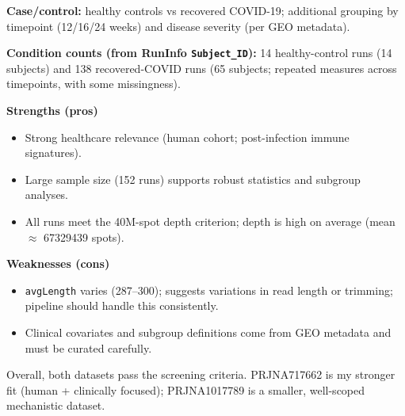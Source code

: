 \documentclass[10pt]{article}
\begin{document}
\textbf{Case/control:} healthy controls vs recovered COVID-19; additional grouping by timepoint (12/16/24 weeks) and disease severity (per GEO metadata).

\textbf{Condition counts (from RunInfo \texttt{Subject\_ID}):} 14 healthy-control runs (14 subjects) and 138 recovered-COVID runs (65 subjects; repeated measures across timepoints, with some missingness).

\textbf{Strengths (pros)}
\begin{itemize}[leftmargin=*]
  \item Strong healthcare relevance (human cohort; post-infection immune signatures).
  \item Large sample size (152 runs) supports robust statistics and subgroup analyses.
  \item All runs meet the 40M-spot depth criterion; depth is high on average (mean \(\approx\) \num{67329439} spots).
\end{itemize}

\textbf{Weaknesses (cons)}
\begin{itemize}[leftmargin=*]
  \item \texttt{avgLength} varies (287--300); suggests variations in read length or trimming; pipeline should handle this consistently.
  \item Clinical covariates and subgroup definitions come from GEO metadata and must be curated carefully.\\
\end{itemize}


Overall, both datasets pass the screening criteria. PRJNA717662 is my stronger fit (human + clinically focused); PRJNA1017789 is a smaller, well-scoped mechanistic dataset.
\end{document}
